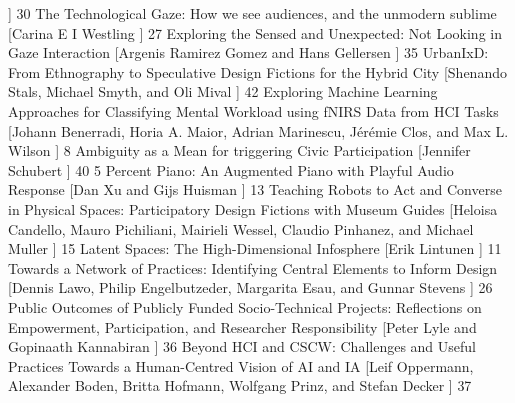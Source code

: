\begin{sessions}
]%
    { 30
}
    {The Technological Gaze: How we see audiences, and the unmodern sublime%
}%
    [Carina E I Westling%
]%
    { 27
}
    {Exploring the Sensed and Unexpected: Not Looking in Gaze Interaction%
}%
    [Argenis Ramirez Gomez and Hans Gellersen%
]%
    { 35
}
    {UrbanIxD: From Ethnography to Speculative Design Fictions for the Hybrid City%
}%
    [Shenando Stals, Michael Smyth, and Oli Mival%
]%
    { 42
}
    {Exploring Machine Learning Approaches for Classifying Mental Workload using fNIRS Data from HCI Tasks%
}%
    [Johann Benerradi, Horia A. Maior, Adrian Marinescu, Jérémie Clos, and Max L. Wilson%
]%
    { 8
}
    {Ambiguity as a Mean for triggering Civic Participation%
}%
    [Jennifer Schubert%
]%
    { 40
}
    {5 Percent Piano: An Augmented Piano with Playful Audio Response%
}%
    [Dan Xu and Gijs Huisman%
]%
    { 13
}
    {Teaching Robots to Act and Converse in Physical Spaces: Participatory Design Fictions with Museum Guides%
}%
    [Heloisa Candello, Mauro Pichiliani, Mairieli Wessel, Claudio Pinhanez, and Michael Muller%
]%
    { 15
}
    {Latent Spaces: The High-Dimensional Infosphere%
}%
    [Erik Lintunen%
]%
    { 11
}
    {Towards a Network of Practices: Identifying Central Elements to Inform Design%
}%
    [Dennis Lawo, Philip Engelbutzeder, Margarita Esau, and Gunnar Stevens%
]%
    { 26
}
    {Public Outcomes of Publicly Funded Socio-Technical Projects: Reflections on Empowerment, Participation, and Researcher Responsibility%
}%
    [Peter Lyle and Gopinaath Kannabiran%
]%
    { 36
}
    {Beyond HCI and CSCW: Challenges and Useful Practices Towards a Human-Centred Vision of AI and IA%
}%
    [Leif Oppermann, Alexander Boden, Britta Hofmann, Wolfgang Prinz, and Stefan Decker%
]%
    { 37
}
 \\
\end{sessions}

